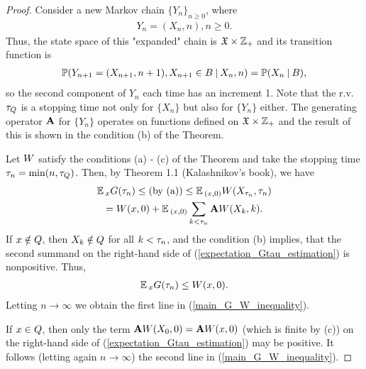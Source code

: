 	\begin{proof}
		Consider a new Markov chain $\{Y_{n}\}_{n \geq 0}$, where
		\begin{gather*}
		Y_{n} = (X_{n}, n), n \geq 0.
		\end{gather*}
		Thus, the state space of this "expanded" chain is $\mathfrak{X} \times \mathbb{Z}_{+}$ and its transition function is
		\begin{gather*}
		\operatorname*{\mathbb{P}}(Y_{n+1} = (X_{n+1}, n+1), X_{n+1} \in B \: | \: X_{n}, n) = \operatorname*{\mathbb{P}}(X_{n} \: | \: B),
		\end{gather*}
		so the second component of $Y_{n}$ each time has an increment 1. Note that the r.v. $\tau_{Q}$ is a stopping time not only for $\{X_{n}\}$ but also for $\{Y_{n}\}$ either. The generating operator $\mathbf{A}$ for $\{Y_{n}\}$ operates on functions defined on $\mathfrak{X} \times \mathbb{Z}_{+}$ and the result of this is shown in the condition (b) of the Theorem.
		
		Let $W$ satisfy the conditions (a) - (c) of the Theorem and take the stopping time $\tau_{n} = \min(n, \tau_{Q})$. Then, by Theorem 1.1 (Kalashnikov's book), we have
		\begin{gather}
		\operatorname*{\mathbb{E}}{}_{x}G(\tau_{n}) \leq \text{(by (a))} \leq \operatorname*{\mathbb{E}}{}_{(x, 0)}W(X_{\tau_{n}}, \tau_{n}) \notag \\ = W(x, 0) + \operatorname*{\mathbb{E}}{}_{(x, 0)}\sum_{k < \tau_{n}}\mathbf{A}W(X_{k}, k).
		\label{expectation_Gtau_estimation}
		\end{gather}
		If $x \notin Q$, then $X_{k} \notin Q$ for all $k < \tau_{n}$, and the condition (b) implies, that the second summand on the right-hand side of (\ref{expectation_Gtau_estimation}) is nonpositive. Thus,
		\begin{gather*}
		\operatorname*{\mathbb{E}}{}_{x}G(\tau_{n}) \leq W(x, 0).
		\end{gather*}
		Letting $n \xrightarrow{} \infty$ we obtain the first line in (\ref{main_G_W_inequality}).
		
		If $x \in Q$, then only the term $\mathbf{A}W(X_{0}, 0) = \mathbf{A}W(x, 0)$ (which is finite by (c)) on the right-hand side of (\ref{expectation_Gtau_estimation}) may be positive. It follows (letting again $n \xrightarrow{} \infty$) the second line in (\ref{main_G_W_inequality}).
		

\end{proof}
